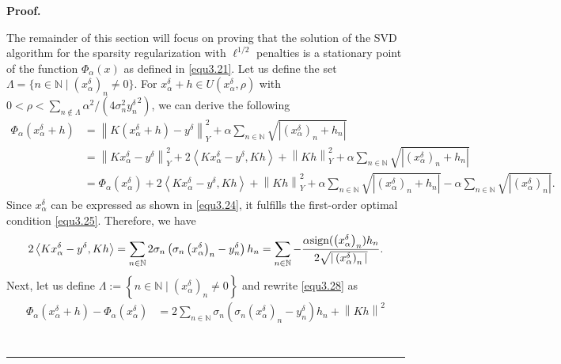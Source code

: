 \documentclass[a4paper,12pt]{article}
\numberwithin{equation}{section}
\newenvironment{proof}[1][Proof]{\textbf{#1.} }
{\ \rule{0.75em}{0.75em}\smallskip}
\begin{document}
\begin{proof}
    \par The remainder of this section will  focus on proving that the solution of the SVD algorithm for the sparsity regularization with $\ell^{1/2}$ penalties is a stationary point of the function $\Phi_{\alpha}\left(x\right)$ as defined in \eqref{equ3.21}. Let us define the set $\Lambda=\{n\in\mathbb{N} \mid \left(x_{\alpha}^{\delta}\right)_{n}\neq 0\}$. For $x_{\alpha}^{\delta}+h\in U\left(x_{\alpha}^{\delta},\rho\right)$ with $0<\rho<\sum_{n\notin\Lambda}\alpha^{2} /(4\sigma_{n}^{2} {y^{\delta}_{n}}^{2})$, we can derive the following
    \begin{align}\label{equ3.28}
        \Phi_{\alpha}\left(x_{\alpha}^{\delta}+h\right)
        & =\left\|K\left(x_{\alpha}^{\delta}+h\right)-y^{\delta}\right\|_{Y}^{2}+ \alpha\sum_{n\in\mathbb{N}}\sqrt{\left|\left(x_{\alpha}^{\delta}\right)_{n} +h_{n}\right|} \nonumber\\
        & =\left\|Kx_{\alpha}^{\delta}-y^{\delta}\right\|_{Y}^{2}+ 2\left<Kx_{\alpha}^{\delta}-y^{\delta},Kh\right>+\left\|Kh\right\|_{Y}^{2}+ \alpha\sum_{n\in\mathbb{N}}\sqrt{\left|\left(x_{\alpha}^{\delta}\right)_{n}+ h_{n}\right|} \nonumber\\
        & =\Phi_{\alpha}\left(x_{\alpha}^{\delta}\right)+2\left<Kx_{\alpha}^{\delta}-y^{\delta},Kh\right> +\left\|Kh\right\|_{Y}^{2}+\alpha\sum_{n\in\mathbb{N}}\sqrt{\left|\left(x_{\alpha}^{\delta}\right)_{n} +h_{n}\right|}-\alpha\sum_{n\in\mathbb{N}}\sqrt{\left|\left(x_{\alpha}^{\delta}\right)_{n}\right|}.
    \end{align}
    Since $x_{\alpha}^{\delta}$ can be expressed as shown in \eqref{equ3.24}, it fulfills the first-order optimal condition \eqref{equ3.25}. Therefore, we have
    \begin{equation*}
        2\left<Kx_{\alpha}^{\delta}-y^{\delta},Kh\right>= \sum_{n\in\mathbb{N}}2\sigma_{n}\left(\sigma_{n}\left(x_{\alpha}^{\delta}\right)_{n} -y^{\delta}_{n}\right) h_{n} =\sum_{n\in\mathbb{N}}-\frac{\alpha {\rm sign} (\left(x_{\alpha}^{\delta}\right)_{n})h_{n}} {2\sqrt{|\left(x_{\alpha}^{\delta}\right)_{n}|}}.
    \end{equation*}
    Next, let us define $\Lambda:=\left\{n\in\mathbb{N} \mid \left(x_{\alpha}^{\delta}\right)_{n}\neq 0\right\}$ and rewrite \eqref{equ3.28} as
    \begin{align*}
        \Phi_{\alpha}\left(x_{\alpha}^{\delta}+h\right)-\Phi_{\alpha}\left(x_{\alpha}^{\delta}\right)
        & =2\sum_{n\in\mathbb{N}}\sigma_{n}\left(\sigma_{n}\left(x_{\alpha}^{\delta}\right)_{n} -y^{\delta}_{n}\right)h_{n}+\left\|Kh\right\|^{2} \nonumber\\

\end{align*}
\end{proof}
\end{document}
